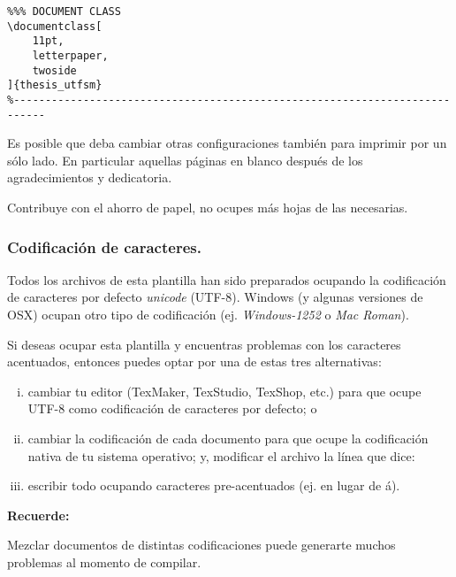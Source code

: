 \begin{Verbatim}[frame=lines, label=\inlinecode{memoria.tex} (extracto)
, fontsize=\footnotesize
, baselinestretch=1
, formatcom=\color{gray}]
%---------------------------------------------------------------------------
%%% DOCUMENT CLASS
\documentclass[
    11pt,
    letterpaper,
    twoside
]{thesis_utfsm}
%---------------------------------------------------------------------------
\end{Verbatim}


Es posible que deba cambiar otras configuraciones también para imprimir por un sólo lado. En particular aquellas páginas en blanco después de los agradecimientos y dedicatoria.

Contribuye con el ahorro de papel, no ocupes más hojas de las necesarias.

\subsubsection*{Codificación de caracteres.}

Todos los archivos  de esta plantilla han sido preparados ocupando la codificación de caracteres por defecto \emph{unicode} (UTF-8). Windows (y algunas versiones de OSX) ocupan otro tipo de codificación (ej. \emph{Windows-1252} o \emph{Mac Roman}).

Si deseas ocupar esta plantilla y encuentras problemas con los caracteres acentuados, entonces puedes optar por una de estas tres alternativas:
\begin{enumerate}[i)]
    \item cambiar tu editor (TexMaker, TexStudio, TexShop, etc.) para que ocupe UTF-8 como codificación de caracteres por defecto; o
    
    \item cambiar la codificación de cada documento  para que ocupe la codificación nativa de tu sistema operativo; y, modificar el archivo  la línea que dice:
    
    
    \item escribir todo ocupando caracteres pre-acentuados (ej.  en lugar de á).
\end{enumerate}

\vspace{10mm}
\begin{framed}
    \noindent\textbf{Recuerde:} 
    
    Mezclar documentos de distintas codificaciones puede generarte muchos problemas al momento de compilar.  
\end{framed}

